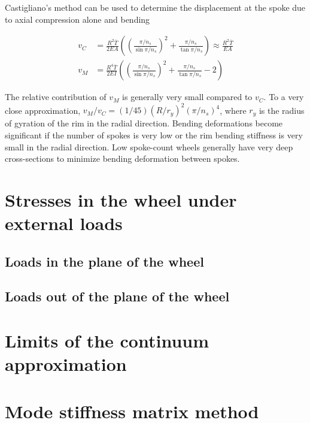 \documentclass[../thesis.tex]{subfiles}
\begin{document}
Castigliano's method can be used to determine the displacement at the spoke due to axial compression alone and bending

\begin{align}
v_C &= \frac{R^2\bar{T}}{2EA} \left( \left(\frac{\pi/n_s}{\sin{\pi/n_s}}\right)^2 +
    \frac{\pi/n_s}{\tan{\pi/n_s}}\right)
    \approx \frac{R^2\bar{T}}{EA}\label{eq:vC}\\
v_M &= \frac{R^4\bar{T}}{2EI} \left( \left(\frac{\pi/n_s}{\sin{\pi/n_s}}\right)^2 +
    \frac{\pi/n_s}{\tan{\pi/n_s}} - 2\right)\label{eq:vM}
\end{align}

The relative contribution of $v_M$ is generally very small compared to $v_C$. To a very close approximation, $v_M/v_C=(1/45)(R/r_y)^2(\pi/n_s)^4$, where $r_y$ is the radius of gyration of the rim in the radial direction. Bending deformations become significant if the number of spokes is very low or the rim bending stiffness is very small in the radial direction. Low spoke-count wheels generally have very deep cross-sections to minimize bending deformation between spokes.


\section{Stresses in the wheel under external loads}

\subsection{Loads in the plane of the wheel}

\subsection{Loads out of the plane of the wheel}


\section{Limits of the continuum approximation}


\section{Mode stiffness matrix method}
\end{document}
